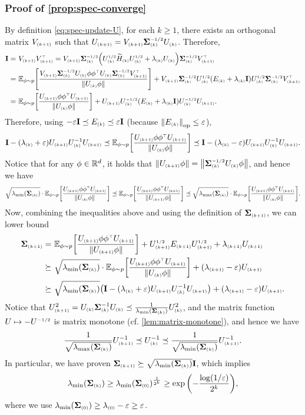 \subsubsection{Proof of \cref{prop:spec-converge}}\label{appdx:proof-spec-converge}
By definition \cref{eq:spec-update-U}, for each $k\geq 1$, there exists an orthogonal matrix $V\kp$ such that $U\kp=V\kp\cov\kk\isq U\kk$. Therefore,
\begin{align*}
    \id=&~V\kp V\kp\tp
    =V\kp \cov\kk\isq \paren{ U\kk\sq \til H\kk U\kk\sq+\lambda\kk U\kk }\cov\kk\isq V\kp\tp \\
    =&~\Ep{ \frac{V\kp\cov\kk\isq U\kk \x\x\tp U\kk \cov\kk\isq V\kp\tp}{\nrm{U\kk\x}} }+V\kp \cov\kk\isq U\kk\sq\paren{ E\kk+\lambda\kk\id }U\kk\sq \cov\kk\isq V\kp\tp \\
    =&~ \Ep{ \frac{U\kp \x\x\tp U\kp}{\nrm{U\kk\x}} }+U\kp U\kk\isq \paren{ E\kk+\lambda\kk\id }U\kk\isq U\kp.
\end{align*}
Therefore, using $-\eps\id\preceq E\kk\preceq \eps\id$ (because $\nrmop{E\kk}\leq \eps$),
\begin{align*}
    \id-(\lambda\kk+\eps)U\kp U\kk^{-1}U\kp \preceq \Ep{ \frac{U\kp \x\x\tp U\kp}{\nrm{U\kk\x}} } \preceq \id-(\lambda\kk-\eps)U\kp U\kk^{-1}U\kp.
\end{align*}
Notice that for any $\x\in\R^d$, it holds that $\nrm{U\kp\x}=\nrm{\cov\kk\isq U\kk\x}$, and hence we have
\begin{align*}
    \sqrt{ \lmin(\cov\kk) }\cdot \Ep{ \frac{U\kp \x\x\tp U\kp}{\nrm{U\kk\x}} } \preceq
    \Ep{ \frac{U\kp \x\x\tp U\kp}{\nrm{U\kp\x}} } \preceq \sqrt{ \lmax(\cov\kk) }\cdot \Ep{ \frac{U\kp \x\x\tp U\kp}{\nrm{U\kk\x}} }.
\end{align*}
Now, combining the inequalities above and using the definition of $\cov\kp$, we can lower bound
\begin{align*}
    \cov\kp=&~\Ep{ \frac{U\kp \x\x\tp U\kp}{\nrm{U\kp\x}} }+U\kp\sq E\kp U\kp\sq+\lambda\kp U\kp \\
    \succeq&~ \sqrt{ \lmin(\cov\kk) }\cdot \Ep{ \frac{U\kp \x\x\tp U\kp}{\nrm{U\kk\x}} } +(\lambda\kp-\eps) U\kp \\
    \succeq&~ \sqrt{ \lmin(\cov\kk) }\paren{ \id-(\lambda\kk+\eps)U\kp U\kk^{-1}U\kp } +(\lambda\kp-\eps) U\kp.
\end{align*}
Notice that $U\kp^2=U\kk\cov\kk^{-1}U\kk\preceq \frac{1}{\lmin(\cov\kk)} U\kk^2$, and the matrix function $U\mapsto -U\isq$ is matrix monotone (cf. \cref{lem:matrix-monotone}), and hence we have
\begin{align}\label{eq:proof-U-iv-k}
    \frac{1}{\sqrt{\lmax(\cov\kk)}} U\kp^{-1} \preceq  U\kk^{-1}\preceq \frac{1}{\sqrt{\lmin(\cov\kk)}} U\kp^{-1}.
\end{align}
In particular, we have proven $\cov\kp\succeq \sqrt{ \lmin(\cov\kk) }\id$, which implies
\begin{align*}
    \lmin(\cov\kk)\geq \lmin(\cov\kz)^{\frac{1}{2^k}}\geq \exp\paren{ -\frac{\log(1/\eps)}{2^k} },
\end{align*}
where we use $\lmin(\cov\kz)\geq \lambda\kz-\eps\geq \eps$.

